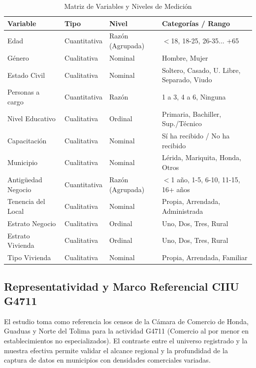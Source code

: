 \documentclass[11pt,a4paper]{article}
\begin{document}
\begin{table}[H]
\centering
\caption{Matriz de Variables y Niveles de Medici\'on}
\footnotesize
\begin{tabular}{@{}llll@{}}
\toprule
Variable          & Tipo          & Nivel    & Categor\'ias / Rango \\ \midrule
Edad                       & Cuantitativa           & Raz\'on (Agrupada) & $<$18, 18-25, 26-35... +65   \\
G\'enero                     & Cualitativa            & Nominal          & Hombre, Mujer               \\
Estado Civil               & Cualitativa            & Nominal          & Soltero, Casado, U. Libre, Separado, Viudo   \\
Personas a cargo           & Cuantitativa           & Raz\'on            & 1 a 3, 4 a 6, Ninguna       \\
Nivel Educativo            & Cualitativa            & Ordinal          & Primaria, Bachiller, Sup./T\'ecnico   \\
Capacitaci\'on               & Cualitativa            & Nominal          & S\'i ha recibido / No ha recibido \\
Municipio                  & Cualitativa            & Nominal          & L\'erida, Mariquita, Honda, Otros    \\
Antig\"uedad Negocio         & Cuantitativa           & Raz\'on (Agrupada) & $<$1 a\~no, 1-5, 6-10, 11-15, 16+ a\~nos \\
Tenencia del  Local        & Cualitativa            & Nominal          & Propia, Arrendada, Administrada     \\
Estrato Negocio            & Cualitativa            & Ordinal          & Uno, Dos, Tres, Rural        \\
Estrato Vivienda           & Cualitativa            & Ordinal          & Uno, Dos, Tres, Rural        \\
Tipo Vivienda              & Cualitativa            & Nominal          & Propia, Arrendada, Familiar  \\ \bottomrule
\end{tabular}
\end{table}

\subsection{Representatividad y Marco Referencial CIIU G4711}
El estudio toma como referencia los censos de la Cámara de Comercio de Honda, Guaduas y Norte del Tolima para la actividad G4711 (Comercio al por menor en establecimientos no especializados). El contraste entre el universo registrado y la muestra efectiva permite validar el alcance regional y la profundidad de la captura de datos en municipios con densidades comerciales variadas.
\end{document}
